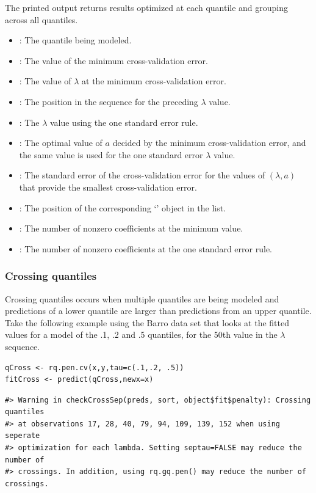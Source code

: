 The printed output returns results optimized at each quantile and grouping across all quantiles.

\begin{itemize}
\item {}: The quantile being modeled.
\item {}: The value of the minimum cross-validation error.
\item {}: The value of $\lambda$ at the minimum cross-validation error.
\item {}: The position in the sequence for the preceding $\lambda$ value.
\item {}: The $\lambda$ value using the one standard error rule.
\item {}: The optimal value of $a$ decided by the minimum cross-validation error, and the same value is used for the one standard error $\lambda$ value.
\item {}: The standard error of the cross-validation error for the values of $(\lambda,a)$ that provide the smallest cross-validation error.
\item {}: The position of the corresponding `' object in the  list.
\item {}: The number of nonzero coefficients at the minimum value.
\item {}: The number of nonzero coefficients at the one standard error rule.
\end{itemize}

\subsubsection{Crossing quantiles}\label{crossing-quantiles}

Crossing quantiles occurs when multiple quantiles are being modeled and predictions of a lower quantile are larger than predictions from an upper quantile. Take the following example using the Barro data set that looks at the fitted values for a model of the .1, .2 and .5 quantiles, for the 50th value in the \(\lambda\) sequence.

\begin{verbatim}
qCross <- rq.pen.cv(x,y,tau=c(.1,.2, .5))
fitCross <- predict(qCross,newx=x)
\end{verbatim}

\begin{verbatim}
#> Warning in checkCrossSep(preds, sort, object$fit$penalty): Crossing quantiles
#> at observations 17, 28, 40, 79, 94, 109, 139, 152 when using seperate
#> optimization for each lambda. Setting septau=FALSE may reduce the number of
#> crossings. In addition, using rq.gq.pen() may reduce the number of crossings.
\end{verbatim}

